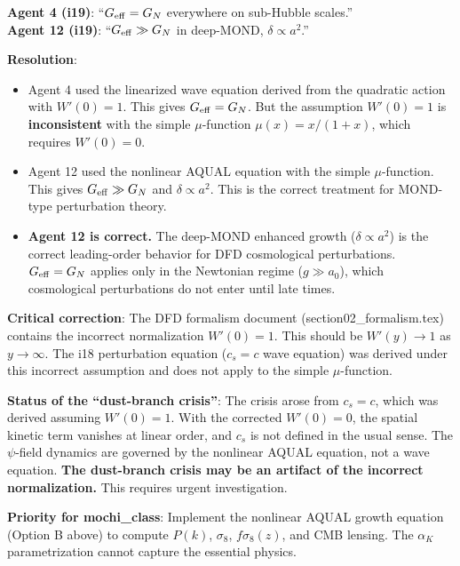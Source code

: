 \documentclass[11pt]{article}
\newcommand{\Geff}{G_{\rm eff}}
\newcommand{\aM}{a_0}
\begin{document}
\begin{tcolorbox}[colback=red!5!white, colframe=red!70!black,
  title=\textbf{FINAL VERDICT ON THE AGENT 4 vs.\ AGENT 12 DISAGREEMENT}]

\textbf{Agent 4 (i19)}: ``$\Geff = G_N$ everywhere on sub-Hubble scales.''\\
\textbf{Agent 12 (i19)}: ``$\Geff \gg G_N$ in deep-MOND, $\delta \propto a^2$.''

\textbf{Resolution}:
\begin{itemize}
\item Agent 4 used the linearized wave equation derived from the
  quadratic action with $W'(0) = 1$. This gives $\Geff = G_N$.
  But the assumption $W'(0) = 1$ is \textbf{inconsistent} with the
  simple $\mu$-function $\mu(x) = x/(1+x)$, which requires
  $W'(0) = 0$.
\item Agent 12 used the nonlinear AQUAL equation with the simple
  $\mu$-function. This gives $\Geff \gg G_N$ and $\delta \propto a^2$.
  This is the correct treatment for MOND-type perturbation theory.
\item \textbf{Agent 12 is correct.} The deep-MOND enhanced growth
  ($\delta \propto a^2$) is the correct leading-order behavior for
  DFD cosmological perturbations. $\Geff = G_N$ applies only in the
  Newtonian regime ($g \gg \aM$), which cosmological perturbations
  do not enter until late times.
\end{itemize}

\textbf{Critical correction}: The DFD formalism document
(section02\_formalism.tex) contains the incorrect normalization
$W'(0) = 1$. This should be $W'(y) \to 1$ as $y \to \infty$.
The i18 perturbation equation ($c_s = c$ wave equation) was derived
under this incorrect assumption and does not apply to the simple
$\mu$-function.

\textbf{Status of the ``dust-branch crisis''}: The crisis arose
from $c_s = c$, which was derived assuming $W'(0) = 1$. With the
corrected $W'(0) = 0$, the spatial kinetic term vanishes at linear
order, and $c_s$ is not defined in the usual sense. The $\psi$-field
dynamics are governed by the nonlinear AQUAL equation, not a wave
equation. \textbf{The dust-branch crisis may be an artifact of the
incorrect normalization.} This requires urgent investigation.

\textbf{Priority for mochi\_class}: Implement the nonlinear AQUAL
growth equation (Option B above) to compute $P(k)$, $\sigma_8$,
$f\sigma_8(z)$, and CMB lensing. The $\alpha_K$ parametrization
cannot capture the essential physics.
\end{tcolorbox}
\end{document}

